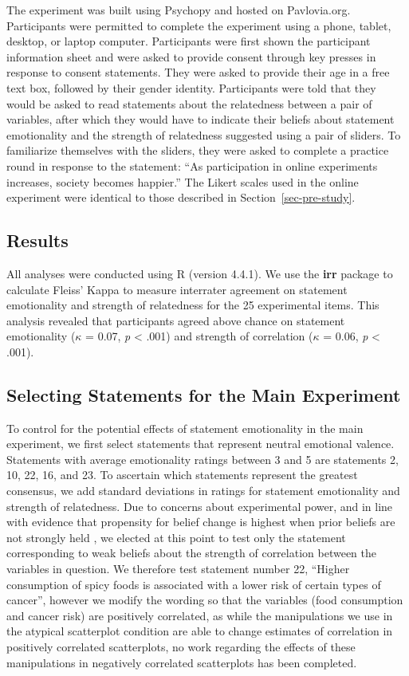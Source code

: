 \documentclass[manuscript,screen,review,anonymous]{acmart}
\begin{document}
The experiment was built using Psychopy \citep{pierce_2019} and hosted
on Pavlovia.org. Participants were permitted to complete the experiment
using a phone, tablet, desktop, or laptop computer. Participants were
first shown the participant information sheet and were asked to provide
consent through key presses in response to consent statements. They were
asked to provide their age in a free text box, followed by their gender
identity. Participants were told that they would be asked to read
statements about the relatedness between a pair of variables, after
which they would have to indicate their beliefs about statement
emotionality and the strength of relatedness suggested using a pair of
sliders. To familiarize themselves with the sliders, they were asked to
complete a practice round in response to the statement: ``As
participation in online experiments increases, society becomes
happier.'' The Likert scales used in the online experiment were
identical to those described in Section~\ref{sec-pre-study}.

\subsection{Results}\label{sec-results-pre}

All analyses were conducted using R (version 4.4.1). We use the
\textbf{irr} package to calculate Fleiss' Kappa to measure interrater
agreement on statement emotionality and strength of relatedness for the
25 experimental items. This analysis revealed that participants agreed
above chance on statement emotionality (\(\kappa\) = 0.07, \emph{p}
\textless{} .001) and strength of correlation (\(\kappa\) = 0.06,
\emph{p} \textless{} .001).

\subsection{Selecting Statements for the Main
Experiment}\label{sec-selecting-statements}

To control for the potential effects of statement emotionality in the
main experiment, we first select statements that represent neutral
emotional valence. Statements with average emotionality ratings between
3 and 5 are statements 2, 10, 22, 16, and 23. To ascertain which
statements represent the greatest consensus, we add standard deviations
in ratings for statement emotionality and strength of relatedness. Due
to concerns about experimental power, and in line with evidence that
propensity for belief change is highest when prior beliefs are not
strongly held \citep{xiong_2022, markant_2023}, we elected at this point
to test only the statement corresponding to weak beliefs about the
strength of correlation between the variables in question. We therefore
test statement number 22, ``Higher consumption of spicy foods is
associated with a lower risk of certain types of cancer'', however we
modify the wording so that the variables (food consumption and cancer
risk) are positively correlated, as while the manipulations we use in
the atypical scatterplot condition are able to change estimates of
correlation in positively correlated scatterplots, no work regarding the
effects of these manipulations in negatively correlated scatterplots has
been completed.
\end{document}
